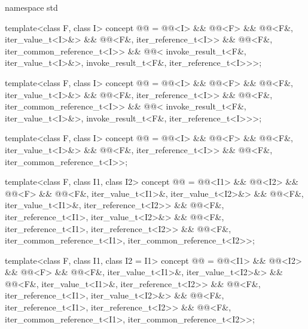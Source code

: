 \begin{codeblock}
namespace std {
  template<class F, class I>
    concept @@ =
      @@<I> &&
      @@<F> &&
      @@<F&, iter_value_t<I>&> &&
      @@<F&, iter_reference_t<I>> &&
      @@<F&, iter_common_reference_t<I>> &&
      @@<
        invoke_result_t<F&, iter_value_t<I>&>,
        invoke_result_t<F&, iter_reference_t<I>>>;

  template<class F, class I>
    concept @@ =
      @@<I> &&
      @@<F> &&
      @@<F&, iter_value_t<I>&> &&
      @@<F&, iter_reference_t<I>> &&
      @@<F&, iter_common_reference_t<I>> &&
      @@<
        invoke_result_t<F&, iter_value_t<I>&>,
        invoke_result_t<F&, iter_reference_t<I>>>;

  template<class F, class I>
    concept @@ =
      @@<I> &&
      @@<F> &&
      @@<F&, iter_value_t<I>&> &&
      @@<F&, iter_reference_t<I>> &&
      @@<F&, iter_common_reference_t<I>>;

  template<class F, class I1, class I2>
    concept @@ =
      @@<I1> && @@<I2> &&
      @@<F> &&
      @@<F&, iter_value_t<I1>&, iter_value_t<I2>&> &&
      @@<F&, iter_value_t<I1>&, iter_reference_t<I2>> &&
      @@<F&, iter_reference_t<I1>, iter_value_t<I2>&> &&
      @@<F&, iter_reference_t<I1>, iter_reference_t<I2>> &&
      @@<F&, iter_common_reference_t<I1>, iter_common_reference_t<I2>>;

  template<class F, class I1, class I2 = I1>
    concept @@ =
      @@<I1> && @@<I2> &&
      @@<F> &&
      @@<F&, iter_value_t<I1>&, iter_value_t<I2>&> &&
      @@<F&, iter_value_t<I1>&, iter_reference_t<I2>> &&
      @@<F&, iter_reference_t<I1>, iter_value_t<I2>&> &&
      @@<F&, iter_reference_t<I1>, iter_reference_t<I2>> &&
      @@<F&, iter_common_reference_t<I1>, iter_common_reference_t<I2>>;

}
\end{codeblock}
